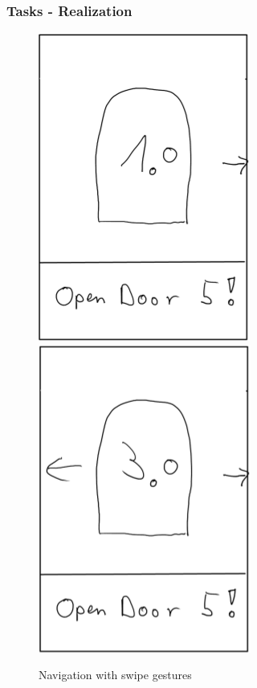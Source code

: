 \documentclass{beamer}
\begin{document}
\begin{frame}
        \frametitle{Tasks - Realization}
		
		
		\begin{figure}
		\includegraphics[scale=0.2]{door1_swipe.png}
		\hspace{1cm}
		\includegraphics[scale=0.2]{door3_swipe.png}
		\caption{Navigation with swipe gestures}
		\end{figure}
		

\end{frame}
\end{document}
